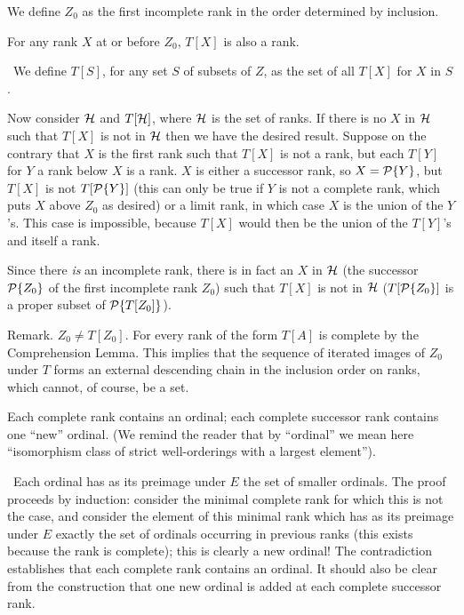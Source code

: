 \begin{definition}
 We define $Z_0$ as the first incomplete rank in
 the order determined by inclusion.
\end{definition}


\begin{lemme} For any rank
$X$ at or before $Z_0$, $T[X]$ is also a rank.
\end{lemme}

\preuve\ We define $T[S]$, for any set $S$ of subsets of $Z$,
as the set of all $T[X]$ for $X$ in $S$.

Now consider $\cal H$ and $T[{\cal H}]$, where $\cal H$ is the set of
ranks.  If there is no $X$ in $\cal H$ such that $T[X]$ is not in $\cal H$ then we have
the desired result.  Suppose on the contrary that $X$ is the first rank
such that $T[X]$ is not a rank, but each $T[Y]$ for $Y$ a rank below $X$ is a
rank.  $X$ is either a successor rank, so $X = {\cal P}\{Y\}$, but $T[X]$ is not
$T[{\cal P}\{Y\}]$ (this can only be true if $Y$ is not a complete rank, which puts
$X$ above $Z_0$ as desired) or a limit rank, in which case $X$ is the union
of the $Y$'s.  This case is impossible, because $T[X]$ would then be the
union of the $T[Y]$'s and itself a rank.

Since there {\em is\/} an incomplete rank, there is in fact an $X$ in $\cal H$ (the
successor ${\cal P}\{Z_0\}$ of the first incomplete rank $Z_0$) such that $T[X]$ is
not in $\cal H$ ($T[{\cal P}\{Z_0\}]$ is a proper subset of ${\cal P}\{T[Z_0]\}$).
\finpreuve

\begin{ThmEtc}{Remark.}
 $Z_0 \neq  T[Z_0]$.  For every rank of the form
 $T[A]$ is complete by the Comprehension Lemma.  This
 implies that the sequence of iterated images of $Z_0$ under
 $T$ forms an external descending chain in the inclusion order on ranks, which
 cannot, of course, be a set.
\end{ThmEtc}

\begin{lemme}
 Each complete rank contains an ordinal; each complete
 successor 
 rank contains one ``new'' ordinal.  (We remind the reader that by
 ``ordinal'' we mean here ``isomorphism class of {\upshape strict}
 well-orderings with a
 largest element'').
\end{lemme}

\preuve\ Each ordinal has as its preimage under $E$ the
set of smaller ordinals.  The proof proceeds by
induction: consider 
the minimal complete rank for which this is not the case, and
consider the element of this minimal rank which has as its preimage
under $E$ exactly the set of ordinals occurring in previous ranks (this
exists because the rank is complete); this is clearly a new ordinal!
The contradiction establishes that each complete rank contains an
ordinal.  It should also be clear from the construction that one new
ordinal is added at each complete successor rank.
\finpreuve

